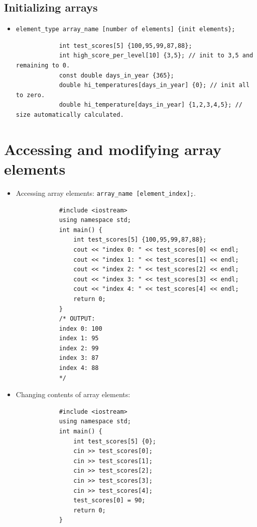 \subsection{Initializing arrays}
\begin{itemize}
    \item \verb|element_type array_name [number of elements] {init elements}; |
        \begin{verbatim}
            int test_scores[5] {100,95,99,87,88};
            int high_score_per_level[10] {3,5}; // init to 3,5 and remaining to 0.
            const double days_in_year {365}; 
            double hi_temperatures[days_in_year] {0}; // init all to zero.
            double hi_temperature[days_in_year] {1,2,3,4,5}; // size automatically calculated.
        \end{verbatim}
\end{itemize}



\section{Accessing and modifying array elements}
\begin{itemize}
    \item Accessing array elements: \verb|array_name [element_index];|.
        \begin{verbatim}
            #include <iostream>
            using namespace std;
            int main() {
                int test_scores[5] {100,95,99,87,88};
                cout << "index 0: " << test_scores[0] << endl;
                cout << "index 1: " << test_scores[1] << endl;
                cout << "index 2: " << test_scores[2] << endl;
                cout << "index 3: " << test_scores[3] << endl;
                cout << "index 4: " << test_scores[4] << endl;
                return 0;
            } 
            /* OUTPUT: 
            index 0: 100
            index 1: 95
            index 2: 99
            index 3: 87
            index 4: 88
            */
        \end{verbatim}
    
    \item Changing contents of array elements: 
        \begin{verbatim}
            #include <iostream>
            using namespace std;
            int main() {
                int test_scores[5] {0};
                cin >> test_scores[0];
                cin >> test_scores[1];
                cin >> test_scores[2];
                cin >> test_scores[3];
                cin >> test_scores[4];
                test_scores[0] = 90;
                return 0;
            } 
        \end{verbatim}
\end{itemize}

